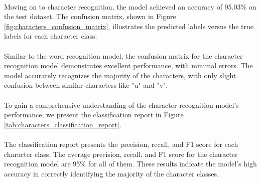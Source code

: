 \paragraph{}
Moving on to character recognition, the model achieved an accuracy of 95.03\% on the test dataset. The confusion matrix, shown in Figure \ref{fig:characters_confusion_matrix}, illustrates the predicted labels versus the true labels for each character class.
\paragraph{}
Similar to the word recognition model, the confusion matrix for the character recognition model demonstrates excellent performance, with minimal errors. The model accurately recognizes the majority of the characters, with only slight confusion between similar characters like "u" and "v".
\paragraph{}
To gain a comprehensive understanding of the character recognition model's performance, we present the classification report in Figure \ref{tab:characters_classification_report}.
\paragraph{}
The classification report presents the precision, recall, and F1 score for each character class. The average precision, recall, and F1 score for the character recognition model are 95\% for all of them. These results indicate the model's high accuracy in correctly identifying the majority of the character classes.
